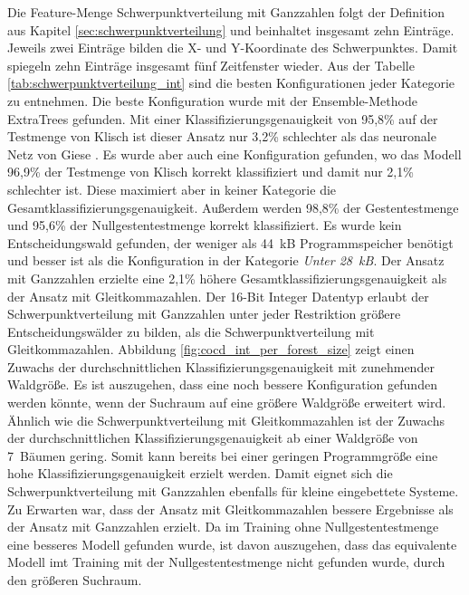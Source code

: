 Die Feature-Menge Schwerpunktverteilung mit Ganzzahlen folgt der Definition aus Kapitel \ref{sec:schwerpunktverteilung} und beinhaltet insgesamt zehn Einträge. Jeweils zwei Einträge bilden die
X- und Y-Koordinate des Schwerpunktes. Damit spiegeln zehn Einträge insgesamt fünf Zeitfenster wieder.
\newline
\newline
Aus der Tabelle \ref{tab:schwerpunktverteilung_int} sind die besten Konfigurationen jeder Kategorie zu entnehmen. Die beste Konfiguration wurde mit der Ensemble-Methode ExtraTrees gefunden.
Mit einer Klassifizierungsgenauigkeit von 95,8\% auf der Testmenge von Klisch ist dieser Ansatz nur 3,2\% schlechter als das neuronale Netz von Giese \cite{gieseThesis}. Es wurde aber auch eine Konfiguration
gefunden, wo das Modell 96,9\% der Testmenge von Klisch korrekt klassifiziert und damit nur 2,1\% schlechter ist. Diese maximiert aber in keiner Kategorie die Gesamtklassifizierungsgenauigkeit.
Außerdem werden 98,8\% der Gestentestmenge und 95,6\% der Nullgestentestmenge korrekt klassifiziert. Es wurde kein Entscheidungswald gefunden, der weniger als 44~kB Programmspeicher benötigt und besser ist als die
Konfiguration in der Kategorie \textit{Unter 28~kB}.
\newline
\newline
Der Ansatz mit Ganzzahlen erzielte eine 2,1\% höhere Gesamtklassifizierungsgenauigkeit als der Ansatz mit Gleitkommazahlen. Der 16-Bit Integer Datentyp erlaubt der Schwerpunktverteilung mit Ganzzahlen unter jeder
Restriktion größere Entscheidungswälder zu bilden, als die Schwerpunktverteilung mit Gleitkommazahlen. Abbildung \ref{fig:cocd_int_per_forest_size} zeigt einen Zuwachs der durchschnittlichen Klassifizierungsgenauigkeit
mit zunehmender Waldgröße. Es ist auszugehen, dass eine noch bessere Konfiguration gefunden werden könnte, wenn der Suchraum auf eine größere Waldgröße erweitert wird. Ähnlich wie die Schwerpunktverteilung mit
Gleitkommazahlen ist der Zuwachs der durchschnittlichen Klassifizierungsgenauigkeit ab einer Waldgröße von 7~Bäumen gering. Somit kann bereits bei einer geringen Programmgröße eine hohe Klassifizierungsgenauigkeit
erzielt werden. Damit eignet sich die Schwerpunktverteilung mit Ganzzahlen ebenfalls für kleine eingebettete Systeme.
\newline
\newline
Zu Erwarten war, dass der Ansatz mit Gleitkommazahlen bessere Ergebnisse als der Ansatz mit Ganzzahlen erzielt. Da im Training ohne Nullgestentestmenge eine besseres Modell gefunden wurde, ist davon
auszugehen, dass das equivalente Modell imt Training mit der Nullgestentestmenge nicht gefunden wurde, durch den größeren Suchraum.